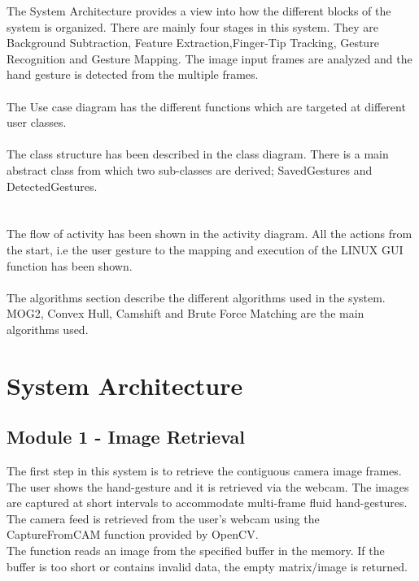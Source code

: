 \documentclass{scrreprt}
\begin{document}
The System Architecture provides a view into how the different blocks of the system is organized.
There are mainly four stages in this system. They are Background Subtraction, Feature Extraction,Finger-Tip Tracking, Gesture Recognition and Gesture Mapping.
The image input frames are analyzed and the hand gesture is detected from the multiple frames.
\\
\\
The Use case diagram has the different functions which are targeted at different user classes.
\\
\\
The class structure has been described in the class diagram. There is a main abstract class from which two 
sub-classes are derived; SavedGestures and DetectedGestures. \\
\\
\\
The flow of activity has been shown in the activity diagram. All the actions from the start, i.e the user gesture to the mapping and execution of the LINUX GUI function has been shown.
\\
\\
The algorithms section describe the different algorithms used in the system.
MOG2, Convex Hull, Camshift and Brute Force Matching are the main algorithms used.
  


\chapter{System Architecture}

\section{Module 1 - Image Retrieval}
The first step in this system is to retrieve the contiguous camera image frames. The user shows the hand-gesture 
and it is retrieved via the webcam. The images are captured at short intervals to accommodate multi-frame fluid hand-gestures.
\\
The camera feed is retrieved from the user's webcam using the CaptureFromCAM function provided by OpenCV.
\\
The function reads an image from the specified buffer in the memory. If the buffer is too short or contains invalid data, the empty matrix/image is returned.
\end{document}
